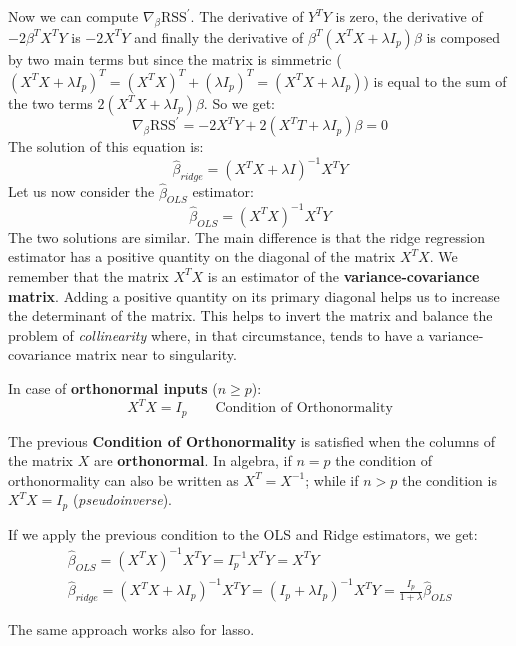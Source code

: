 Now we can compute $\nabla_\beta \text{RSS}^{\prime} $. The derivative of $Y^T Y$ is zero, the derivative of $- 2 \beta^T X^T Y $ is $- 2 X^T Y $ and finally the derivative of $\beta^T (X^T X + \lambda I_p) \beta$ is composed by two main terms but since the matrix is simmetric ($(X^TX+\lambda I_p)^T=(X^TX)^T+(\lambda I_p)^T=(X^TX+\lambda I_p)$) is equal to the sum of the two terms $2(X^T X + \lambda I_p) \beta$. So we get:
\[
    \nabla_\beta\text{RSS}^{\prime} = - 2X^T Y + 2(X^T T + \lambda I_p) \beta = 0
\]
The solution of this equation is:
\[
    \hat{\beta}_{ridge} = (X^T X + \lambda I)^{-1} X^T Y
\]
Let us now consider the $\hat{\beta}_{OLS}$ estimator:
\[
    \hat{\beta}_{OLS} = (X^T X)^{-1} X^T Y
\]
The two solutions are similar. 
The main difference is that the ridge regression estimator has a positive quantity on the diagonal of the matrix $X^T X$.
We remember that the matrix $X^T X$ is an estimator of the \textbf{variance-covariance matrix}.
Adding a positive quantity on its primary diagonal helps us to increase the determinant of the matrix. This helps to invert the matrix and balance the problem of \textit{collinearity} where, in that circumstance, tends to have a variance-covariance matrix near to singularity.

In case of \textbf{orthonormal inputs} ($n \geq p$):
\[
    X^T X = I_p \qquad \text{Condition of Orthonormality}
\]

The previous \textbf{Condition of Orthonormality} is satisfied when the columns of the matrix $X$ are \textbf{orthonormal}. 
In algebra, if $n = p$ the condition of orthonormality can also be written as $X^T = X^{-1}$; while if $n > p$ the condition is $X^T X = I_p$ (\textit{pseudoinverse}).

If we apply the previous condition to the OLS and Ridge estimators, we get:
\begin{gather*}
    \hat{\beta}_{OLS} = (X^T X)^{-1} X^T Y = I_p^{-1} X^T Y = X^T Y \\
    \hat{\beta}_{ridge} = (X^TX + \lambda I_p)^{-1}X^T Y = (I_p + \lambda I_p)^{-1} X^T Y = \frac{I_p}{1+\lambda} \hat{\beta}_{OLS}
\end{gather*}

The same approach works also for lasso.

